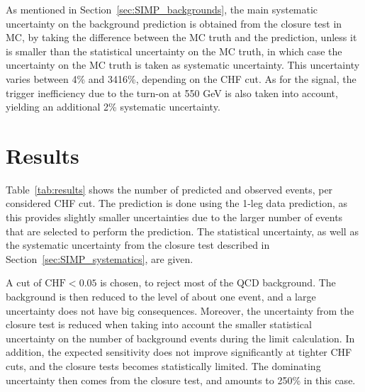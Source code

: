 As mentioned in Section~\ref{sec:SIMP_backgrounds}, the main systematic uncertainty on the background prediction is obtained from the closure test in MC, by taking the difference between the MC truth and the prediction, unless it is smaller than the statistical uncertainty on the MC truth, in which case the uncertainty on the MC truth is taken as systematic uncertainty. This uncertainty varies between 4\% and 3416\%, depending on the CHF cut. As for the signal, the trigger inefficiency due to the turn-on at 550 GeV is also taken into account, yielding an additional 2\% systematic uncertainty.

\section{Results}
\label{sec:SIMP_results}

Table~\ref{tab:results} shows the number of predicted and observed events, per considered CHF cut. The prediction is done using the 1-leg data prediction, as this provides slightly smaller uncertainties due to the larger number of events that are selected to perform the prediction. The statistical uncertainty, as well as the systematic uncertainty from the closure test described in Section~\ref{sec:SIMP_systematics}, are given.

A cut of $\mathrm{CHF} < 0.05$ is chosen, to reject most of the \acs{QCD} background. The background is then reduced to the level of about one event, and a large uncertainty does not have big consequences. Moreover, the uncertainty from the closure test is reduced when taking into account the smaller statistical uncertainty on the number of background events during the limit calculation. In addition, the expected sensitivity does not improve significantly at tighter CHF cuts, and the closure tests becomes statistically limited. The dominating uncertainty then comes from the closure test, and amounts to 250\% in this case.

